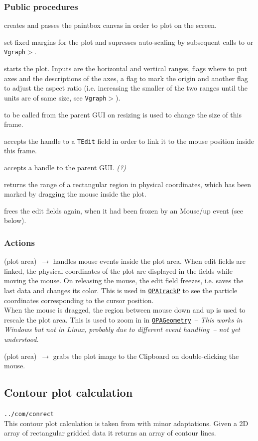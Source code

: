 \documentclass[12pt]{article}
\newcommand\code[1]{{\tt #1}}
\newcommand{\ofldx}[1]{\colorbox{black!15}{(#1)}}
\newcommand\guifco[1]{{\color{violet}\code{#1}}}
\newcommand{\evcodxf}[2]{\ofldx{#1}~$\rightarrow$ \guifco{#2}}
\newcommand{\gfcod}[2]{\opaguif{#1}$>$\guifco{#2}}
\newcommand{\opagui}[1]{\colorbox{blue!20}{\code{#1}}}
\newcommand{\ogui}[1]{\hyperref[#1]{\opagui{#1}}}
\newcommand{\opaguif}[1]{\colorbox{violet!30}{\code{#1}}}
\newcommand{\opauni}[1]{\colorbox{orange!30}{\code{#1}}}
\newcommand{\ounih}[2]{\subsection{\label{#2}#1}{\Huge\opauni{#2}}\\}
\newcommand{\desc}[1]{#1}
\newcommand{\act}[1]{\subsubsection*{Actions} #1}
\newcommand{\ppro}[1]{\subsubsection*{Public procedures} #1}
\newcommand{\todo}[1]{{\color{red}\em #1}}
\begin{document}
\ppro{

\guifco{assignScreen} creates \guifco{Vplot} and passes the paintbox canvas in order to plot on the screen.

\guifco{forceMargin*} set fixed margins for the plot and supresses auto-scaling by subsequent calls to \guifco{Init} or \gfcod{Vgraph}{Axis}.

\guifco{Init} starts the plot. Inputs are the horizontal and vertical ranges, flags where to put axes and the descriptions of the axes, a flag to mark the origin and another flag to adjust the aspect ratio (i.e. increasing the smaller of the two ranges until the units are of same size, see \gfcod{Vgraph}{AdjustAspectRatio}).

\guifco{SetSize} to be called from the parent GUI on resizing is used to change the size of this frame.

\guifco{PassEditHandle*} accepts the handle to a \code{TEdit} field in order to link it to the mouse position inside this frame.

\guifco{PassFormHandle} accepts a handle to the parent GUI. \todo{(?)}

\guifco{GetRange} returns the range of a rectangular region in physical coordinates, which has been marked by dragging the mouse inside the plot.

\guifco{UnfreezeEdit} frees the edit fields again, when it had been frozen by an Mouse/up event (see below).
}


\act{
\evcodxf{plot area}{pMouseDown,pMouseMove,pMouseUp} handles mouse events inside the plot area.
When edit fields are linked, the physical coordinates of the plot are displayed in the fields while moving the mouse. On releasing the mouse, the edit field freezes, i.e. saves the last data and changes its color.
This is used in \ogui{OPAtrackP} %
to see the particle coordinates corresponding to the cursor position. \\
When the mouse is dragged, the region between mouse down and up is used to rescale the plot area. This is used to zoom in in \ogui{OPAGeometry}~-- \todo{This works in Windows but not in Linux, probably due to different event handling~-- not yet understood.}

\evcodxf{plot area}{pDblClick} grabs the plot image to the Clipboard on double-clicking the mouse.
}



\ounih{Contour plot calculation}{../com/conrect}

\desc{This contour plot calculation is taken from \cite{CONRECT} with minor adaptations. Given a 2D array of rectangular gridded data it returns an array of contour lines.}
\end{document}
